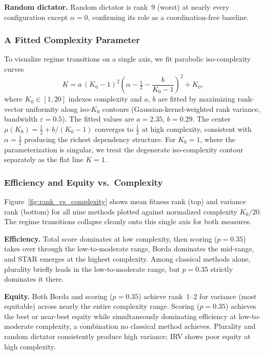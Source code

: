 \textbf{Random dictator.} Random dictator is rank~9 (worst) at nearly every configuration except $\alpha = 0$, confirming its role as a coordination-free baseline.

\subsubsection{A Fitted Complexity Parameter}

To visualize regime transitions on a single axis, we fit parabolic iso-complexity curves
\begin{equation}
  K = a\,(K_0 - 1)^2 \left(\alpha - \tfrac{1}{2} - \frac{b}{K_0 - 1}\right)^{\!2} + K_0,
  \label{eq:complexity}
\end{equation}
where $K_0 \in [1, 20]$ indexes complexity and $a$, $b$ are fitted by maximizing rank-vector uniformity along iso-$K_0$ contours (Gaussian-kernel-weighted rank variance, bandwidth $\varepsilon = 0.5$). The fitted values are $a = 2.35$, $b = 0.29$. The center $\mu(K_0) = \tfrac{1}{2} + b/(K_0-1)$ converges to $\tfrac{1}{2}$ at high complexity, consistent with $\alpha = \tfrac{1}{2}$ producing the richest dependency structure.
For $K_0 = 1$, where the parameterization is singular, we treat the degenerate
iso-complexity contour separately as the flat line $K=1$.

\subsubsection{Efficiency and Equity vs.\ Complexity}

Figure~\ref{fig:rank_vs_complexity} shows mean fitness rank (top) and variance rank (bottom) for all nine methods plotted against normalized complexity $K_0/20$. The regime transitions collapse cleanly onto this single axis for both measures.

\textbf{Efficiency.} Total score dominates at low complexity, then scoring ($p\!=\!0.35$) takes over through the low-to-moderate range, Borda dominates the mid-range, and STAR emerges at the highest complexity. Among classical methods alone, plurality briefly leads in the low-to-moderate range, but $p\!=\!0.35$ strictly dominates it there.

\textbf{Equity.} Both Borda and scoring ($p\!=\!0.35$) achieve rank~1--2 for variance (most equitable) across nearly the entire complexity range. Scoring ($p\!=\!0.35$) achieves the best or near-best equity while simultaneously dominating efficiency at low-to-moderate complexity, a combination no classical method achieves. Plurality and random dictator consistently produce high variance; IRV shows poor equity at high complexity.


